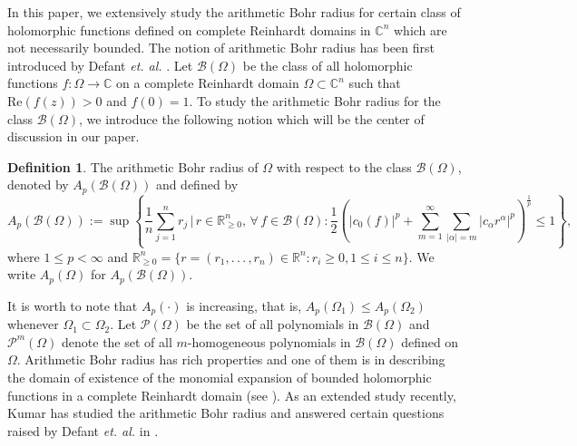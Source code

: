\documentclass[a4paper,12pt]{amsart}
\theoremstyle{definition}
\newtheorem{defn}{Definition}[section]
\begin{document}
In this paper, we extensively study the arithmetic Bohr radius for certain class of holomorphic functions defined on complete Reinhardt domains in $\mathbb{C}^n$ which are not necessarily bounded. The notion of arithmetic Bohr radius has been first introduced by Defant {\it et. al.} \cite{defant-2007}. Let $\mathcal{B}(\Omega)$ be the class of all holomorphic functions $f: \Omega \rightarrow \mathbb{C}$ on a complete Reinhardt domain $\Omega\subset \mathbb{C}^n$ such that $\mbox{Re} (f(z))>0$ and $f(0)=1$. To study the arithmetic Bohr radius for the class $\mathcal{B}(\Omega)$, we introduce the following notion which will be the center of discussion in our paper.

\begin{defn}
	The	arithmetic Bohr radius of $\Omega$ with respect to the class $\mathcal{B}(\Omega)$, denoted by $A_p(\mathcal{B}(\Omega))$ and defined by
	\begin{equation*}
		A_{p}(\mathcal{B}(\Omega)):= \sup \left\{\frac{1}{n}\sum_{j=1}^{n}r_j\,|\, r\in \mathbb{R}^n_{\geq0}, \, \forall \, f\in \mathcal{B}(\Omega) : \frac{1}{2}\left(|c_0(f)|^p + \sum_{m=1}^{\infty}\sum_{|\alpha|=m}|c_{\alpha}r^{\alpha}|^p\right)^{\frac{1}{p}}\leq 1 \right\},
	\end{equation*}
	where $1\leq p< \infty$ and $\mathbb{R}^n_{\geq 0}=\{r=(r_1,.\,.\,.\,,r_n)\in \mathbb{R}^n : r_{i}\geq 0, 1\leq i\leq n\}$. We write $A_p(\Omega)$ for $A_p(\mathcal{B}(\Omega))$.
\end{defn}
It is worth to note that $A_p(\cdot)$ is increasing, that is, $A_p(\Omega_{1})\leq A_p(\Omega_{2})$ whenever $\Omega_{1} \subset \Omega_{2}.$ Let $\mathcal{P}(\Omega)$ be the set of all polynomials in $\mathcal{B}(\Omega)$ and $\mathcal{P}^m(\Omega)$ denote the set of all $m$-homogeneous polynomials in $\mathcal{B}(\Omega)$ defined on $\Omega$.
Arithmetic Bohr radius has rich properties and one of them is in describing the domain of existence of the monomial expansion of bounded holomorphic functions in a complete Reinhardt domain (see \cite{prengel-2005}). As an extended study recently, Kumar \cite{kumar-2023} has studied the arithmetic Bohr radius and answered certain questions raised by Defant {\it et. al.} in \cite{defant-2007}. 
\vspace{2mm}

 
\end{document}
